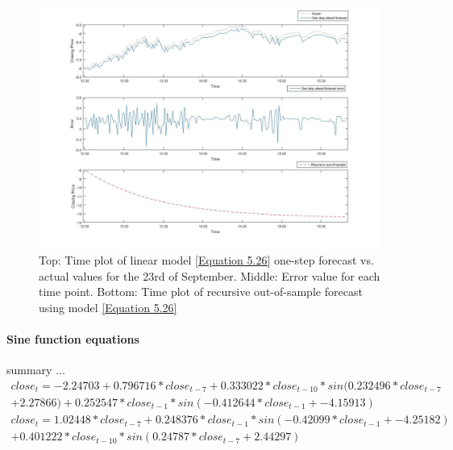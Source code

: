 \documentclass[13pt]{report}
\begin{document}
\begin{figure}[H]
\centering
\label{VWlinear23fig}
\includegraphics[width= \textwidth]{23linear}
\caption{Top: Time plot of linear model \ref{Equation 5.26} one-step forecast vs. actual values for the 23rd of September. Middle: Error value for each time point. Bottom: Time plot of recursive out-of-sample forecast using model \ref{Equation 5.26}}
\end{figure}

\paragraph{Sine function equations}\hfill \break
summary ...
\begin{equation}
\begin{align*}
close_{t} = -2.24703 + 0.796716 * close_{t-7} + 0.333022 * close_{t-10} * sin ( 0.232496 * close_{t-7} \\ + 2.27866 ) + 0.252547 * close_{t-1} * sin ( -0.412644 * close_{t-1} + -4.15913 )
\end{align*}
\label{Equation 5.27}
\end{equation}
\begin{equation}
\begin{align*}
close_{t} = 1.02448 * close_{t-7} + 0.248376 * close_{t-1} * sin ( -0.42099 * close_{t-1} + -4.25182 ) \\ + 0.401222 * close_{t-10} * sin ( 0.24787 * close_{t-7} + 2.44297 )
\end{align*}
\label{Equation 5.28}
\end{equation}
\end{document}
